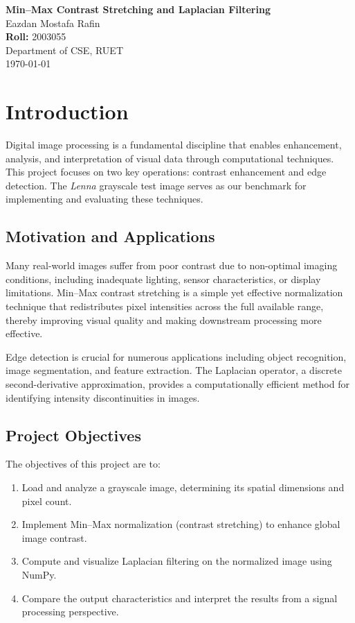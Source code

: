 \documentclass[a4paper,12pt]{article}
\begin{document}
\begin{center}
    {\LARGE \textbf{Min--Max Contrast Stretching and Laplacian Filtering}}\\[0.5em]
     Eazdan Mostafa Rafin\\[0.25em]
    \textbf{Roll:} 2003055\\[0.25em]
    Department of CSE, RUET\\[0.75em]
    \today
\end{center}
\vspace{0.5em}

\section{Introduction}
Digital image processing is a fundamental discipline that enables enhancement, analysis, and interpretation of visual data through computational techniques. This project focuses on two key operations: contrast enhancement and edge detection. The \textit{Lenna} grayscale test image serves as our benchmark for implementing and evaluating these techniques.

\subsection{Motivation and Applications}
Many real-world images suffer from poor contrast due to non-optimal imaging conditions, including inadequate lighting, sensor characteristics, or display limitations. Min--Max contrast stretching is a simple yet effective normalization technique that redistributes pixel intensities across the full available range, thereby improving visual quality and making downstream processing more effective.

Edge detection is crucial for numerous applications including object recognition, image segmentation, and feature extraction. The Laplacian operator, a discrete second-derivative approximation, provides a computationally efficient method for identifying intensity discontinuities in images.

\subsection{Project Objectives}
The objectives of this project are to:
\begin{enumerate}
    \item Load and analyze a grayscale image, determining its spatial dimensions and pixel count.
    \item Implement Min--Max normalization (contrast stretching) to enhance global image contrast.
    \item Compute and visualize Laplacian filtering on the normalized image using NumPy.
    \item Compare the output characteristics and interpret the results from a signal processing perspective.
\end{enumerate}
\end{document}
